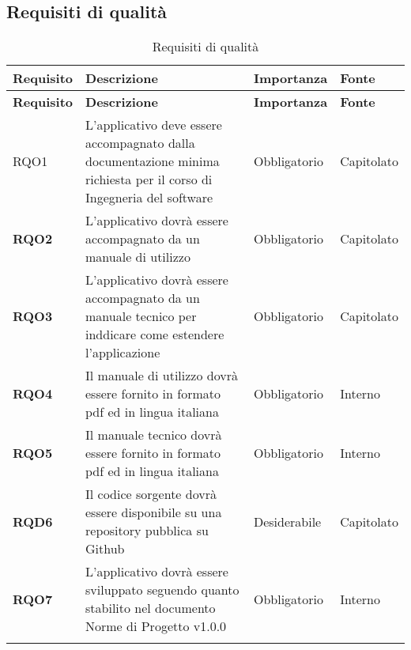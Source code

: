 \subsection{Requisiti di qualità}
\label{sub:requisiti_di_qualita}

\renewcommand{\arraystretch}{2} %
\begin{longtable}[H]{>{\centering\bfseries}m{2cm} >{\centering}m{9cm} >{\centering}m{2.5cm} >{\centering\arraybackslash}m{2.5cm}}
    \rowcolor{lightgray}
    {\textbf{Requisito}} & {\textbf{Descrizione}} & {\textbf{Importanza}} & {\textbf{Fonte}}  \\
    \endfirsthead%
    \rowcolor{lightgray}
    {\textbf{Requisito}} & {\textbf{Descrizione}} & {\textbf{Importanza}} & {\textbf{Fonte}}  \\
    \endhead%
    \rowcolor{white}
    \multicolumn{4}{c}{\textit{Continua alla pagina successiva}}
    \endfoot%
    \endlastfoot%

    RQO1
        & L'applicativo deve essere accompagnato dalla documentazione minima richiesta per il corso di Ingegneria del software
        & Obbligatorio
        & Capitolato \\

    RQO2
        & L'applicativo dovrà essere accompagnato da un manuale di utilizzo
        & Obbligatorio
        & Capitolato \\

    RQO3
        & L'applicativo dovrà essere accompagnato da un manuale tecnico per inddicare come estendere l'applicazione
        & Obbligatorio
        & Capitolato \\

    RQO4
        & Il manuale di utilizzo dovrà essere fornito in formato pdf ed in lingua italiana
        & Obbligatorio
        & Interno \\

    RQO5
        & Il manuale tecnico dovrà essere fornito in formato pdf ed in lingua italiana
        & Obbligatorio
        & Interno \\

    RQD6
        & Il codice sorgente dovrà essere disponibile su una repository pubblica su Github
        & Desiderabile
        & Capitolato \\

    RQO7
        & L'applicativo dovrà essere sviluppato seguendo quanto stabilito nel documento Norme di Progetto v1.0.0
        & Obbligatorio
        & Interno \\

    \caption{Requisiti di qualità}%
    \label{tab:requisiti_di_qualita}
\end{longtable}
